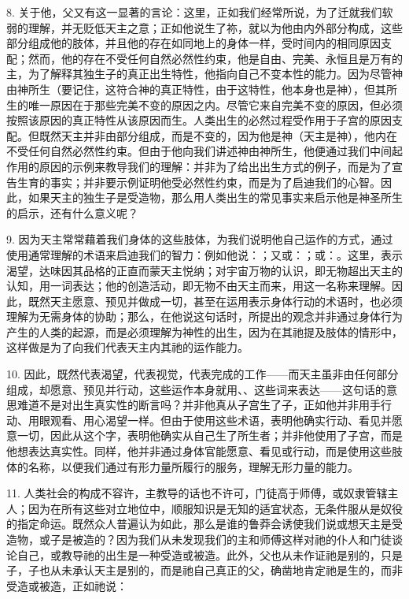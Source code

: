 8. 关于他，父又有这一显著的言论：这里，正如我们经常所说，为了迁就我们软弱的理解，并无贬低天主之意；正如他说生了祢，就以为他由内外部分构成，这些部分组成他的肢体，并且他的存在如同地上的身体一样，受时间内的相同原因支配；然而，他的存在不受任何自然必然性约束，他是自由、完美、永恒且是万有的主，为了解释其独生子的真正出生特性，他指向自己不变本性的能力。因为尽管神由神所生（要记住，这符合神的真正特性，由于这特性，他本身也是神），但其所生的唯一原因在于那些完美不变的原因之内。尽管它来自完美不变的原因，但必须按照该原因的真正特性从该原因而生。人类出生的必然过程受作用于子宫的原因支配。但既然天主并非由部分组成，而是不变的，因为他是神（天主是神），他内在不受任何自然必然性约束。但由于他向我们讲述神由神所生，他便通过我们中间起作用的原因的示例来教导我们的理解：并非为了给出出生方式的例子，而是为了宣告生育的事实；并非要示例证明他受必然性约束，而是为了启迪我们的心智。因此，如果天主的独生子是受造物，那么用人类出生的常见事实来启示他是神圣所生的启示，还有什么意义呢？\par

9. 因为天主常常藉着我们身体的这些肢体，为我们说明他自己运作的方式，通过使用通常理解的术语来启迪我们的智力：例如他说：；又或：；或：。这里，表示渴望，达味因其品格的正直而蒙天主悦纳；对宇宙万物的认识，即无物超出天主的认知，用一词表达；他的创造活动，即无物不由天主而来，用这一名称来理解。因此，既然天主愿意、预见并做成一切，甚至在运用表示身体行动的术语时，也必须理解为无需身体的协助；那么，在他说这句话时，所提出的观念并非通过身体行为产生的人类的起源，而是必须理解为神性的出生，因为在其祂提及肢体的情形中，这样做是为了向我们代表天主内其祂的运作能力。\par

10. 因此，既然代表渴望，代表视觉，代表完成的工作——而天主虽非由任何部分组成，却愿意、预见并行动，这些运作本身就用、、这些词来表达——这句话的意思难道不是对出生真实性的断言吗？并非他真从子宫生了子，正如他并非用手行动、用眼观看、用心渴望一样。但由于使用这些术语，表明他确实行动、看见并愿意一切，因此从这个字，表明他确实从自己生了所生者；并非他使用了子宫，而是他想表达真实性。同样，他并非通过身体官能愿意、看见或行动，而是使用这些肢体的名称，以便我们通过有形力量所履行的服务，理解无形力量的能力。\par

11. 人类社会的构成不容许，主教导的话也不许可，门徒高于师傅，或奴隶管辖主人；因为在所有这些对立地位中，顺服知识是无知的适宜状态，无条件服从是奴役的指定命运。既然众人普遍认为如此，那么是谁的鲁莽会诱使我们说或想天主是受造物，或子是被造的？因为我们从未发现我们的主和师傅这样对祂的仆人和门徒谈论自己，或教导祂的出生是一种受造或被造。此外，父也从未作证祂是别的，只是子，子也从未承认天主是别的，而是祂自己真正的父，确凿地肯定祂是生的，而非受造或被造，正如祂说：\par


